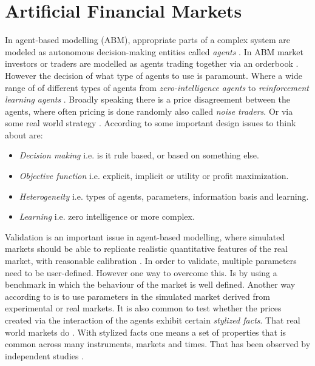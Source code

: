 \documentclass{kththesis}
\theoremstyle{definition}
\begin{document}


\section{Artificial Financial Markets}
In agent-based modelling (ABM), appropriate parts of a complex system are modeled as autonomous decision-making entities called \textit{agents} \parencite{darley2007nasdaq}. In ABM market investors or traders are modelled as agents trading together via an orderbook \parencite{lussange2018bright}. However the decision of what type of agents to use is paramount. Where a wide range of of different types of agents from \textit{zero-intelligence agents} to \textit{reinforcement learning agents} \parencite{martinez2009evolutionary}. Broadly speaking there is a price disagreement between the agents, where often pricing is done randomly also called \textit{noise traders}. Or via some real world strategy \parencite{lussange2018bright}. According to \textcite{martinez2009evolutionary} some important design issues to think about are:

\begin{itemize}
    \item \textit{Decision making} i.e. is it rule based, or based on something else.
    \item \textit{Objective function} i.e. explicit, implicit or utility or profit maximization.
    \item \textit{Heterogeneity} i.e. types of agents, parameters, information basis and learning.
    \item \textit{Learning} i.e. zero intelligence or more complex.
\end{itemize}
Validation is an important issue in agent-based modelling, where simulated markets should be able to replicate realistic quantitative features of the real market, with reasonable calibration \parencite{martinez2009evolutionary}. In order to validate, multiple parameters need to be user-defined. However one way to overcome this. Is by using a benchmark in which the behaviour of the market is well defined. Another way according to \textcite{martinez2009evolutionary} is to use parameters in the simulated market derived from experimental or real markets. 
\newline
\newline
It is also common to test whether the prices created via the interaction of the agents exhibit certain \textit{stylized facts}. That real world markets do \parencite{brandouy2011design}. With stylized facts one means a set of properties that is common across many instruments, markets and times. That has been observed by independent studies \parencite{cont2001empirical}. 
\newpage
\end{document}
